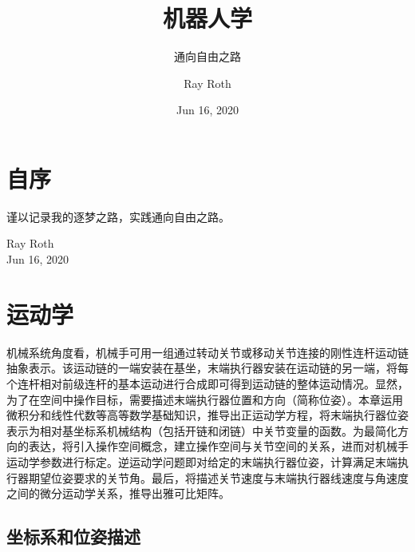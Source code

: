 \documentclass[cn,11pt,chinese,blue,bibstyle=ieeetr]{elegantbook}
\title{机器人学}
\subtitle{通向自由之路}
\author{Ray Roth}
\institute{Enabot}
\date{Jun 16, 2020}
\begin{document}
\maketitle
\frontmatter

\chapter*{自序}
谨以记录我的逐梦之路，实践通向自由之路。

\vskip 1.5cm

\begin{flushright}
Ray Roth\\
Jun 16, 2020
\end{flushright}

\tableofcontents

\mainmatter


\chapter{运动学}

机械系统角度看，机械手可用一组通过转动关节或移动关节连接的刚性连杆运动链抽象表示。该运动链的一端安装在基坐，末端执行器安装在运动链的另一端，将每个连杆相对前级连杆的基本运动进行合成即可得到运动链的整体运动情况。显然，为了在空间中操作目标，需要描述末端执行器位置和方向（简称位姿）。本章运用微积分和线性代数等高等数学基础知识，推导出正运动学方程，将末端执行器位姿表示为相对基坐标系机械结构（包括开链和闭链）中关节变量的函数。为最简化方向的表达，将引入操作空间概念，建立操作空间与关节空间的关系，进而对机械手运动学参数进行标定。逆运动学问题即对给定的末端执行器位姿，计算满足末端执行器期望位姿要求的关节角。最后，将描述关节速度与末端执行器线速度与角速度之间的微分运动学关系，推导出雅可比矩阵。

\begin{introduction}
	\item {}
	\item {}
	\item {}
	\item {}
	\item {}
\end{introduction}


\section{坐标系和位姿描述}\label{coordinate_system_and_pose_description}
\end{document}
